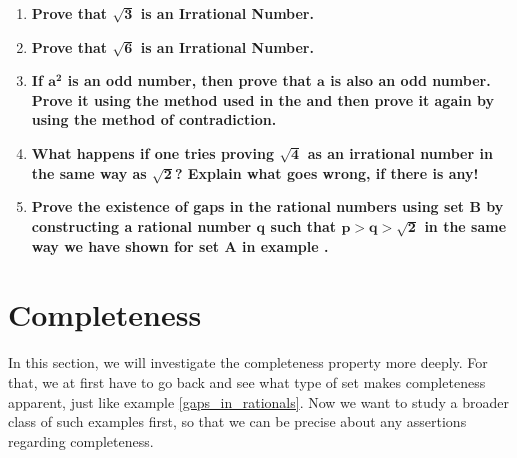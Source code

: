 \exercise
\begin{enumerate}[label=\textbf{\arabic*.}]
    \item \textbf{Prove that $\pmb{\sqrt{3}}$ is an Irrational Number.}
    \item \textbf{Prove that $\pmb{\sqrt{6}}$ is an Irrational Number.}
    \item \textbf{If $\pmb{a^2}$ is an odd number, then prove that $\pmb{a}$ is also an odd number. Prove it using the method used in the  and then prove it again by using the method of contradiction.}
    \item \textbf{What happens if one tries proving $\pmb{\sqrt{4}}$ as an irrational number in the same way as $\pmb{\sqrt{2}}$? Explain what goes wrong, if there is any!} 
    \item \textbf{Prove the existence of gaps in the rational numbers using set $\pmb{B}$ by constructing a rational number $\pmb{q}$ such that $\pmb{p>q>\sqrt{2}}$ in the same way we have shown for set $\pmb{A}$ in example \pmb{\eqref{gaps_in_rationals}}.}
\end{enumerate}
\section{Completeness}
In this section, we will investigate the completeness property more deeply. For that, we at first have to go back and see what type of set makes completeness apparent, just like example \eqref{gaps_in_rationals}. Now we want to study a broader class of such examples first, so that we can be precise about any assertions regarding completeness.
